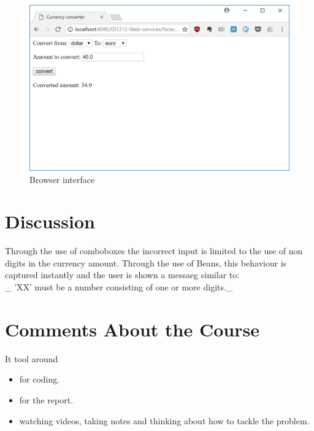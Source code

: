 \documentclass[a4paper]{scrartcl}
\begin{document}
\begin{figure}[h!]
  \begin{center}
    \includegraphics[scale=0.5]{ui.png}
    \caption{Browser interface}
    \label{fig:ui}
  \end{center}
\end{figure}

\section{Discussion}
Through the use of comboboxes the incorrect input is limited to the use of non digits in the currency amount.
Through the use of Beans, this behaviour is captured instantly and the user is shown a messaeg similar to:
\\_ 'XX' must be a number consisting of one or more digits._

\section{Comments About the Course}

It tool around
\begin{itemize}
        \item  for coding.
        \item for the report.
        \item  watching videos, taking notes and thinking about how to tackle the problem.
\end{itemize}
\end{document}
